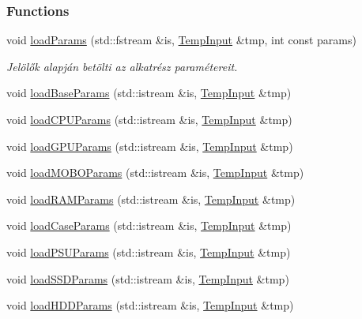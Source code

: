 \subsubsection*{Functions}
\begin{DoxyCompactItemize}
\item 
void \mbox{\hyperlink{_inventory_8h_acecc59385cd8970fe6e368ea592362be}{load\+Params}} (std\+::fstream \&is, \mbox{\hyperlink{struct_temp_input}{Temp\+Input}} \&tmp, int const params)
\begin{DoxyCompactList}\small\item\em Jelölők alapján betölti az alkatrész paramétereit. \end{DoxyCompactList}\item 
void \mbox{\hyperlink{_inventory_8h_af88785d286c8ea9392930b904f687672}{load\+Base\+Params}} (std\+::istream \&is, \mbox{\hyperlink{struct_temp_input}{Temp\+Input}} \&tmp)
\item 
void \mbox{\hyperlink{_inventory_8h_a0565beb9b5429fe7cf6edcb88becc168}{load\+C\+P\+U\+Params}} (std\+::istream \&is, \mbox{\hyperlink{struct_temp_input}{Temp\+Input}} \&tmp)
\item 
void \mbox{\hyperlink{_inventory_8h_aa795cbf45c10e4533a23961614749d05}{load\+G\+P\+U\+Params}} (std\+::istream \&is, \mbox{\hyperlink{struct_temp_input}{Temp\+Input}} \&tmp)
\item 
void \mbox{\hyperlink{_inventory_8h_ab92e8bf2c22b5df04897f18e888d7973}{load\+M\+O\+B\+O\+Params}} (std\+::istream \&is, \mbox{\hyperlink{struct_temp_input}{Temp\+Input}} \&tmp)
\item 
void \mbox{\hyperlink{_inventory_8h_aec5377baa2a6064a69b04423103d85ea}{load\+R\+A\+M\+Params}} (std\+::istream \&is, \mbox{\hyperlink{struct_temp_input}{Temp\+Input}} \&tmp)
\item 
void \mbox{\hyperlink{_inventory_8h_a47e65a05879001febd45f541ab230b86}{load\+Case\+Params}} (std\+::istream \&is, \mbox{\hyperlink{struct_temp_input}{Temp\+Input}} \&tmp)
\item 
void \mbox{\hyperlink{_inventory_8h_a198252da076147a0ef1f4d721bdb2219}{load\+P\+S\+U\+Params}} (std\+::istream \&is, \mbox{\hyperlink{struct_temp_input}{Temp\+Input}} \&tmp)
\item 
void \mbox{\hyperlink{_inventory_8h_ac358a7371dcac8ed9d7aba003099c193}{load\+S\+S\+D\+Params}} (std\+::istream \&is, \mbox{\hyperlink{struct_temp_input}{Temp\+Input}} \&tmp)
\item 
void \mbox{\hyperlink{_inventory_8h_ab09373672ea8d4ea19f1903344fe327a}{load\+H\+D\+D\+Params}} (std\+::istream \&is, \mbox{\hyperlink{struct_temp_input}{Temp\+Input}} \&tmp)
\end{DoxyCompactItemize}


